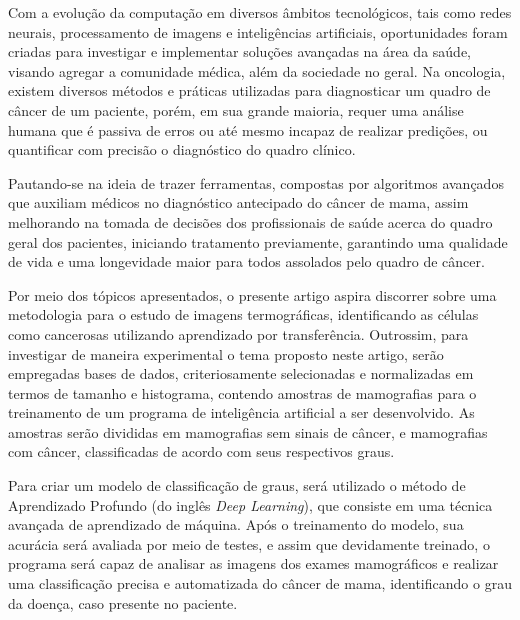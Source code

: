 Com a evolução da computação em diversos âmbitos tecnológicos, tais como redes neurais, processamento de imagens e inteligências artificiais, oportunidades foram criadas para investigar e implementar soluções avançadas na área da saúde, visando agregar a comunidade médica, além da sociedade no geral. Na oncologia, existem diversos métodos e práticas utilizadas para diagnosticar um quadro de câncer de um paciente, porém, em sua grande maioria, requer uma análise humana que é passiva de erros ou até mesmo incapaz de realizar predições, ou quantificar com precisão o diagnóstico do quadro clínico.

Pautando-se na ideia de trazer ferramentas, compostas por algoritmos avançados que auxiliam médicos no diagnóstico antecipado do câncer de mama, assim melhorando na tomada de decisões dos profissionais de saúde acerca do quadro geral dos pacientes, iniciando tratamento previamente, garantindo uma qualidade de vida e uma longevidade maior para todos assolados pelo quadro de câncer.

Por meio dos tópicos apresentados, o presente artigo aspira discorrer sobre uma metodologia para o estudo de imagens termográficas, identificando as células como cancerosas utilizando aprendizado por transferência. Outrossim, para investigar de maneira experimental o tema proposto neste artigo, serão empregadas bases de dados, criteriosamente selecionadas e normalizadas em termos de tamanho e histograma, contendo amostras de mamografias para o treinamento de um programa de inteligência artificial a ser desenvolvido. As amostras serão divididas em mamografias sem sinais de câncer, e mamografias com câncer, classificadas de acordo com seus respectivos graus.

Para criar um modelo de classificação de graus, será utilizado o método de Aprendizado Profundo (do inglês \textit{Deep Learning}), que consiste em uma técnica avançada de aprendizado de máquina. Após o treinamento do modelo, sua acurácia será avaliada por meio de testes, e assim que devidamente treinado, o programa será capaz de analisar as imagens dos exames mamográficos e realizar uma classificação precisa e automatizada do câncer de mama, identificando o grau da doença, caso presente no paciente.






